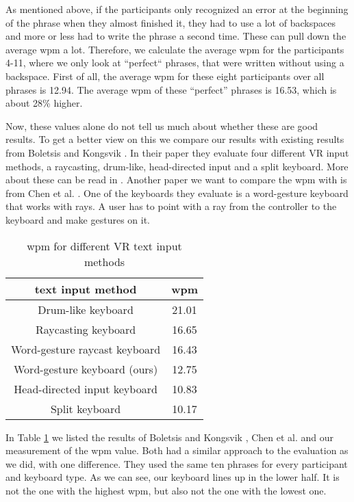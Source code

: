 As mentioned above, if the participants only recognized an error at the beginning of the phrase when they almost finished it, they had to use a lot of backspaces and more or less had to write the phrase a second time. These can pull down the average wpm a lot. Therefore, we calculate the average wpm for the participants 4-11, where we only look at ``perfect`` phrases, that were written without using a backspace. First of all, the average wpm for these eight participants over all phrases is 12.94. The average wpm of these ``perfect'' phrases is 16.53, which is about 28\% higher.

Now, these values alone do not tell us much about whether these are good results. To get a better view on this we compare our results with existing results from Boletsis and Kongsvik \cite{Boletsis2019ControllerbasedTT}. In their paper they evaluate four different VR input methods, a raycasting, drum-like, head-directed input and a split keyboard. More about these can be read in . Another paper we want to compare the wpm with is from Chen et al. \cite{10.1145/3290607.3312762}. One of the keyboards they evaluate is a word-gesture keyboard that works with rays. A user has to point with a ray from the controller to the keyboard and make gestures on it.
\begin{table}[ht!]
    \centering
    \caption{wpm for different VR text input methods}
    \begin{tabular}{cc} \toprule
        text input method&wpm\\ \midrule
        Drum-like keyboard& 21.01\\
        Raycasting keyboard& 16.65\\
        Word-gesture raycast keyboard& 16.43\\
        Word-gesture keyboard (ours)& 12.75\\
        Head-directed input keyboard& 10.83\\
        Split keyboard& 10.17\\
        \bottomrule
    \end{tabular}
    \label{tab:wpm_compare}
\end{table}

In Table \ref{tab:wpm_compare} we listed the results of Boletsis and Kongsvik \cite{Boletsis2019ControllerbasedTT},  Chen et al. \cite{10.1145/3290607.3312762} and our measurement of the wpm value. Both had a similar approach to the evaluation as we did, with one difference. They used the same ten phrases for every participant and keyboard type. As we can see, our keyboard lines up in the lower half. It is not the one with the highest wpm, but also not the one with the lowest one.\\

